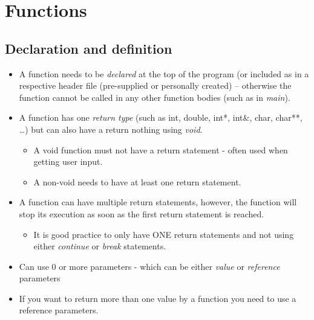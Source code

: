 \section{Functions}

\subsection{Declaration and definition}

\begin{itemize}
	\item A function needs to be \emph{declared} at the top of the program (or included
	as in a respective header file (pre-supplied or personally created) -- otherwise the function
	cannot be called in any other function bodies (such as in \emph{main}).
	\item A function has one \emph{return type} (such as int, double, int*, int\&, char, char**, \ldots)
	but can also have a return nothing using \emph{void}.
	\begin{itemize}
		\item A void function must not have a return statement - often used when getting user input.
		\item A non-void needs to have at least one return statement.
	\end{itemize}
	\item A function can have multiple return statements, however, the function will stop its
	execution as soon as the first return statement is reached.
	\begin{itemize}
		\item It is good practice to only have ONE return statements and not using either \emph{continue}
		or \emph{break} statements.
	\end{itemize}
	\item Can use 0 or more parameters - which can be either \emph{value} or \emph{reference} parameters
	\item If you want to return more than one value by a function you need to use a reference parameters.
\end{itemize}



